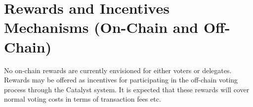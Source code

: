 \section{Rewards and Incentives Mechanisms (On-Chain and Off-Chain)}

No on-chain rewards are currently envisioned for either voters or delegates.   Rewards may be offered as incentives for participating in the off-chain voting process through
the Catalyst system.  It is expected that these rewards will cover normal voting costs in terms of transaction fees etc.
